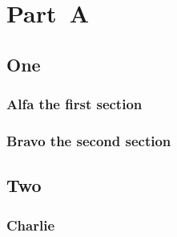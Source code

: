 \documentclass[10pt,a4paper,oneside]{book}
\begin{document}
\dominitoc
\doparttoc
\newcommand\alfati{\ifinparttoc Alfa in parttoc
                   \else\ifinminitoc Alfa in minitoc
                        \else Alfa out subtoc
                        \fi
                   \fi}
\DeclareRobustCommand{\varsecti}[3]%
          {\ifinparttoc{#1}\relax
           \else\ifinminitoc{#2}\relax
                \else{#3}\relax
                \fi
           \fi}
\tableofcontents
\part{Part~A}
\parttoc

\chapter{One}
\minitoc
\section[\protect\alfati]{Alfa the first section}
\lipsum[1]
\section[\varsecti{Bravo in parttoc}%
                          {Bravo in minitoc}%
                          {Bravo out of subtoc}]%
        {Bravo the second section}   %
\lipsum[2]
\chapter{Two}
\minitoc
\section[\mtcpolymtoc%
        {Charlie in parttoc}%
        {Charlie in minitoc}%
        {Charlie in secttoc}%
        {Charlie out subtoc}]%
        {Charlie}
\lipsum[3]
\end{document}
